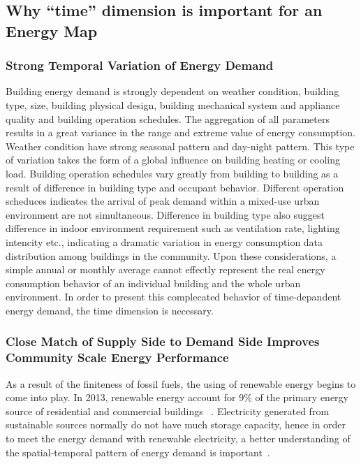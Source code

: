 \documentclass[hidelinks,12pt]{article}
\begin{document}
\subsection{Why ``time'' dimension is important for an Energy Map}
\subsubsection{Strong Temporal Variation of Energy Demand}
Building energy demand is strongly dependent on weather condition,
building type, size, building physical design, building mechanical
system and appliance quality and building operation schedules.  The
aggregation of all parameters results in a great variance in the range
and extreme value of energy consumption. Weather condition have strong
seasonal pattern and day-night pattern. This type of variation takes
the form of a global influence on building heating or cooling
load. Building operation schedules vary greatly from building to
building as a result of difference in building type and occupant
behavior. Different operation scheduces indicates the arrival of peak
demand within a mixed-use urban environment are not
simultaneous. Difference in building type also suggest difference in
indoor environment requirement such as ventilation rate, lighting
intencity etc., indicating a dramatic variation in energy consumption
data distribution among buildings in the community. Upon these
considerations, a simple annual or monthly average cannot effectly
represent the real energy consumption behavior of an individual
building and the whole urban environment. In order to present this
complecated behavior of time-depandent energy demand, the time
dimension is necessary.

\begin{comment}
\subsubsection{Temporal variation of the Supply Side}
The commonly used renewable energy source includes: solar, wind,
geothermal, hydropower and biomass. Among these sources, solar energy
have strong temporal fluctuation as a result of the temporal variation
of solar radiation between different hours of a year and the time of
year~\cite{EIARenewable2015}. There is also a cost difference involved
in the electricity supply.
\end{comment}

\subsubsection{Close Match of Supply Side to Demand Side Improves Community Scale Energy Performance} 
As a result of the finiteness of fossil fuels, the using of renewable
energy begins to come into play. In 2013, renewable energy account for
9\% of the primary energy source of residential and commercial
buildings ~\cite{EIAPrimary2013}. Electricity generated from
sustainable sources normally do not have much storage capacity, hence
in order to meet the energy demand with renewable electricity, a
better understanding of the spatial-temporal pattern of energy demand
is important~\cite{Mikkola2014256}.
\end{document}
